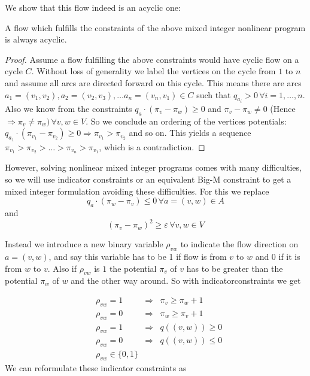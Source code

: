 We show that this flow indeed is an acyclic one:

\begin{prop}
 A flow which fulfills the constraints of the above mixed integer nonlinear program is always acyclic.
\end{prop}
\begin{proof}
 Assume a flow fulfilling the above constraints would have cyclic flow on a cycle $C$. Without loss of generality 
we label the vertices on the cycle from $1$ to $n$ and assume all arcs are directed forward on this cycle. This means 
there are arcs $a_1=(v_1,v_2),a_2=(v_2,v_3), \dots a_n=(v_n, v_1)\in C$ such that $q_{a_i} > 0 \,\forall i={1,\dots , 
n}$. Also we know from the constraints  $q_a\cdot (\pi_v -\pi_w)\ge 0$ and $\pi_v - \pi_w \neq 0$ (Hence $\Rightarrow 
\pi_v\neq\pi_w)\, \forall v,w\in V$. So we conclude an ordering of the vertices potentials: $q_{a_1}\cdot (\pi_{v_1} 
-\pi_{v_2})\ge 0 \Rightarrow \pi_{v_1}>\pi_{v_2}$ and so on. This yields a sequence $\pi_{v_1}>\pi_{v_2}>\dots 
>\pi_{v_n}>\pi_{v_1}$, which is a contradiction. \Lightning
\end{proof}

However, solving nonlinear mixed integer programs comes with many difficulties, so we will use indicator constraints 
or an equivalent Big-M constraint to get a mixed integer formulation avoiding these difficulties. For this we  replace 
$$q_a\cdot (\pi_w -\pi_v)\le 0 \,\forall a=(v,w)\in A $$ and $$(\pi_v - \pi_w)^2 \ge \varepsilon \,\forall v,w \in V$$

Instead we introduce a new binary variable $\rho_{vw}$ to indicate the flow direction on $a=(v,w)$, and say this 
variable has to be 1 if flow is from $v$ to $w$ and 0 if it is from $w$ to $v$. Also if $\rho_{vw}$ is $1$ the 
potential $\pi_v$ of $v$ has to be greater than the potential $\pi_w$ of $w$ and the other way around. So with 
indicatorconstraints we get 

\begin{align*}
 &\rho_{vw}=1 &\Rightarrow &\pi_v\ge\pi_w +1\\
 &\rho_{vw}=0 &\Rightarrow &\pi_w\ge\pi_v +1\\
 &\rho_{vw}=1 &\Rightarrow &q((v,w))\ge 0\\
 &\rho_{vw}=0 &\Rightarrow &q((v,w))\le 0\\
 &\rho_{vw} \in \{0,1\}&&
\end{align*}
We can reformulate these indicator constraints as

